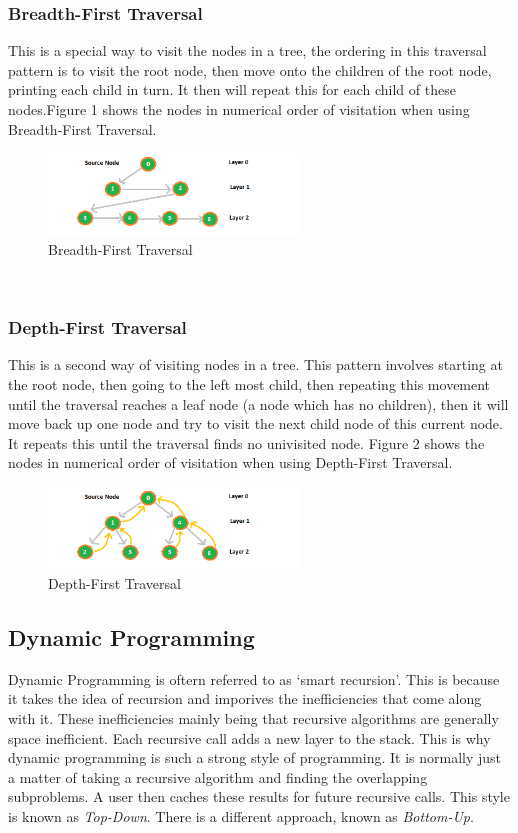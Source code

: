 \documentclass[10pt,twocolumn]{IEEEtran}
\begin{document}
\subsubsection{Breadth-First Traversal}
This is a special way to visit the nodes in a tree, the ordering in this traversal pattern is to visit the root node, then move onto the children of the root node, printing each child in turn. It then will repeat this for each child of these nodes.Figure 1 shows the nodes in numerical order of visitation when using Breadth-First Traversal. \\
\begin{figure}[h]
\includegraphics[width=0.6\textwidth]{bfs.png}
\caption{Breadth-First Traversal}
\end{figure}
 \\
\subsubsection{Depth-First Traversal}
This is a second way of visiting nodes in a tree. This pattern involves starting at the root node, then going to the left most child, then repeating this movement until the traversal reaches a leaf node (a node which has no children), then it will move back up one node and try to visit the next child node of this current node. It repeats this until the traversal finds no univisited node. Figure 2 shows the nodes in numerical order of visitation when using Depth-First Traversal. 
\begin{figure}[h]
\includegraphics[width=0.6\textwidth]{dfs.png}
\caption{Depth-First Traversal}
\end{figure}

\subsection{Dynamic Programming}
Dynamic Programming is oftern referred to as `smart recursion'. This is because it takes the idea of recursion and imporives the inefficiencies that come along with it. These inefficiencies mainly being that recursive algorithms are generally space inefficient. Each recursive call adds a new layer to the stack. This is why dynamic programming is such a strong style of programming. It is normally just a matter of taking a recursive algorithm and finding the overlapping subproblems. A user then caches these results for future recursive calls.
This style is known as \textit{Top-Down}. There is a different approach, known as \textit{Bottom-Up}.
\end{document}

